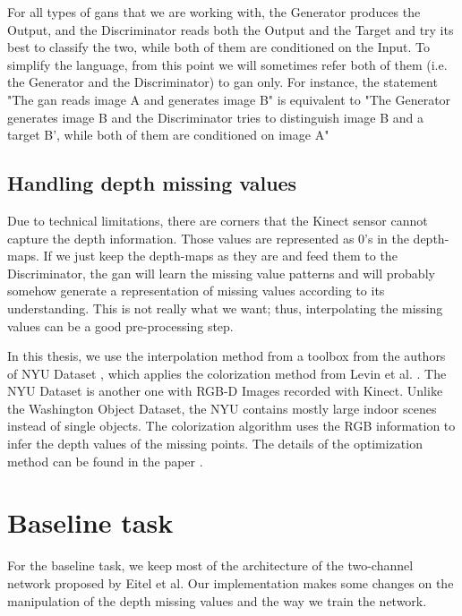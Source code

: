 For all types of \acrshort{gan}s that we are working with, the Generator produces the
Output, and the Discriminator reads both the Output and the Target and try its best to
classify the two, while both of them are conditioned on the Input. To simplify the
language, from this point we will sometimes refer both of them (i.e. the Generator and the
Discriminator) to \acrshort{gan} only. For instance, the statement "The \acrshort{gan} reads
image A and generates image B" is equivalent to "The Generator generates image B and the
Discriminator tries to distinguish image B and a target B', while both of them are
conditioned on image A"

\subsection{Handling depth missing values \label{sub:missing_values}}

Due to technical limitations, there are corners that the Kinect sensor cannot capture the
depth information. Those values are represented as 0's in the depth-maps. If we just keep
the depth-maps as they are and feed them to the Discriminator, the \acrshort{gan} will
learn the missing value patterns and will probably somehow generate a representation of
missing values according to its understanding. This is not really what we want; thus,
interpolating the missing values can be a good pre-processing step.

In this thesis, we use the interpolation method from a toolbox from the authors of NYU
Dataset \cite{nyu_dataset}, which applies the colorization method from Levin et al.
\cite{levin_colorization}. The NYU Dataset is another one with RGB-D Images recorded with
Kinect. Unlike the Washington Object Dataset, the NYU contains mostly large indoor scenes
instead of single objects. The colorization algorithm uses the RGB information to infer
the depth values of the missing points. The details of the optimization method can be
found in the paper \cite{levin_colorization}.

\section{Baseline task}

For the baseline task, we keep most of the architecture of the two-channel network proposed
by Eitel et al. Our implementation makes some changes on the manipulation of the depth
missing values and the way we train the network. 

